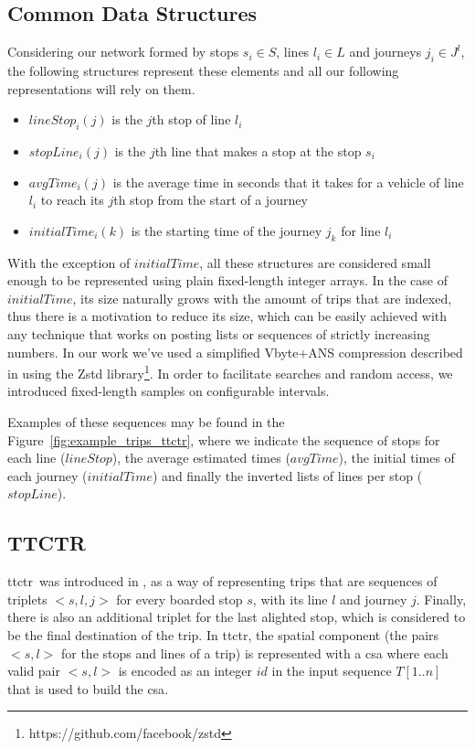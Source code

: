     \subsection{Common Data Structures}
    \label{sec:cs}
    Considering our network formed by stops $s_i \in S$, lines $l_i \in L$ and journeys $j_i \in J^l$, the following structures represent these elements and all our following representations will rely on them.
    
    \begin{itemize}
        \item $lineStop_i(j)$ is the $j$th stop of line $l_i$
        \item $stopLine_i(j)$ is the $j$th line that makes a stop at the stop $s_i$
        \item $avgTime_i(j)$ is the average time in seconds that it takes for a vehicle of line $l_i$ to reach its $j$th stop from the start of a journey
        \item $initialTime_i(k)$ is the starting time of the journey $j_k$ for line $l_i$
    \end{itemize}
    
    With the exception of $initialTime$, all these structures are considered small enough to be represented using plain fixed-length integer arrays. In the case of $initialTime$, its size naturally grows with the amount of trips that are indexed, thus there is a motivation to reduce its size, which can be easily achieved with any technique that works on posting lists or sequences of strictly increasing numbers. In our work we've used a simplified Vbyte+ANS compression described in \cite{moffat2017ans} using the Zstd library\footnote{https://github.com/facebook/zstd}. In order to facilitate searches and random access, we introduced fixed-length samples on configurable intervals.
    
    Examples of these sequences may be found in the Figure~\ref{fig:example_trips_ttctr}, where we indicate the sequence of stops for each line ($lineStop$), the average estimated times ($avgTime$), the initial times of each journey ($initialTime$) and finally the inverted lists of lines per stop ($stopLine$).
    
    \subsection{TTCTR}
    \gls{ttctr}~was introduced in \cite{brisaboa2018new}, as a way of representing trips that are sequences of triplets $<s,l,j>$ for every boarded stop $s$, with its line $l$ and journey $j$. Finally, there is also an additional triplet for the last alighted stop, which is considered to be the final destination of the trip. In \gls{ttctr}, the spatial component (the pairs $<s,l>$ for the stops and lines of a trip) is represented with a \gls{csa} where each valid pair $<s,l>$ is encoded as an integer $id$ in the input sequence $T[1..n]$ that is used to build the \gls{csa}.

